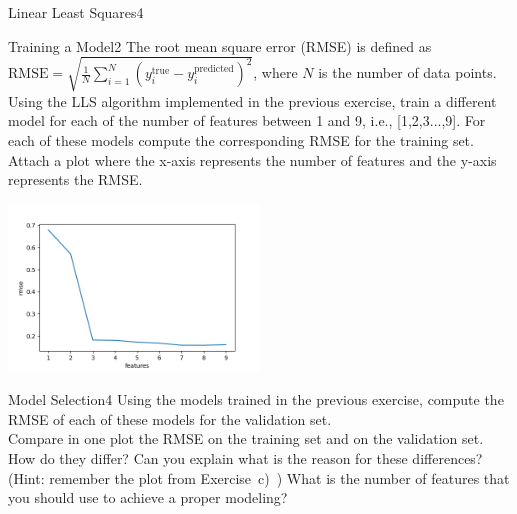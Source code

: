 \begin{questions}
\begin{question}{Linear Least Squares}{4}
	\end{question}
	
	
	
	\begin{question}{Training a Model}{2}
		The root mean square error (RMSE) is defined as $\text{RMSE} = \sqrt{\frac{1}{N}\sum_{i=1}^{N}(y^{\text{true}}_i-y^{\text{predicted}}_i)^{2}}$, where $N$ is the number of data points. 
		Using the LLS algorithm implemented in the previous exercise, train a different model for each of the number of features between 1 and 9, i.e.,  [1,2,3...,9].
		For each of these models compute the corresponding RMSE for the training set. 
		Attach a plot where the x-axis represents the number of features and the y-axis represents the RMSE.
		
\begin{answer}
	\begin{center}
		\includegraphics[width=0.5\textwidth]{img/3d.png} 
	\end{center}
	
\end{answer}
		
	\end{question}
	
	
	
	\begin{question}{Model Selection}{4}
		Using the models trained in the previous exercise, compute the RMSE of each of these models for the validation set.\\
		Compare in one plot the RMSE on the training set and on the validation set. 
		How do they differ? 
		Can you explain what is the reason for these differences? (Hint: remember the plot from Exercise~c)~) 
		What is the number of features that you should use to achieve a proper modeling?
		

\end{question}
\end{questions}
